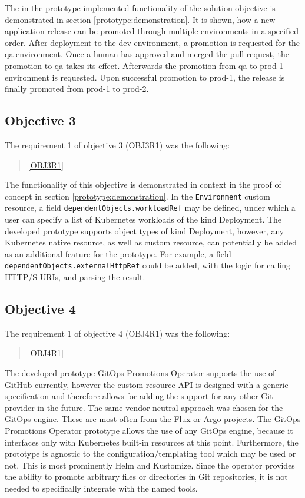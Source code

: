 The in the prototype implemented functionality of the solution objective is demonstrated in section
\ref{prototype:demonstration}.
It is shown, how a new application release can be promoted through multiple environments in a specified order.
After deployment to the dev environment, a promotion is requested for the qa environment.
Once a human has approved and merged the pull request, the promotion to qa takes its effect.
Afterwards the promotion from qa to prod-1 environment is requested. Upon successful promotion to prod-1,
the release is finally promoted from prod-1 to prod-2.

\subsection*{Objective 3}

The requirement 1 of objective 3 (OBJ3R1) was the following:

\begin{quotation}
	\noindent
	\ref{OBJ3R1}
\end{quotation}

The functionality of this objective is demonstrated in context in the proof of concept
in section \ref{prototype:demonstration}.
In the \lstinline|Environment| custom resource,
a field \lstinline|dependentObjects.workloadRef| may be defined, under which a user can specify
a list of Kubernetes workloads of the kind Deployment.
The developed prototype supports object types of kind Deployment,
however, any Kubernetes native resource, as well as custom resource, can potentially be added as an
additional feature for the prototype.
For example, a field \lstinline|dependentObjects.externalHttpRef| could be added,
with the logic for calling HTTP/S URIs, and parsing the result.

\subsection*{Objective 4}

The requirement 1 of objective 4 (OBJ4R1) was the following:

\begin{quotation}
	\noindent
	\ref{OBJ4R1}
\end{quotation}

The developed prototype GitOps Promotions Operator supports the use of GitHub currently,
however the custom resource API is designed with a generic specification and therefore allows
for adding the support for any other Git provider in the future.
The same vendor-neutral approach was chosen for the GitOps engine.
These are most often from the Flux or Argo projects.
The GitOps Promotions Operator prototype allows the use of any GitOps engine,
because it interfaces only with Kubernetes built-in resources at this point.
Furthermore, the prototype is agnostic to the configuration/templating tool which may be used or not.
This is most prominently Helm and Kustomize. Since the operator provides the ability
to promote arbitrary files or directories in Git repositories, it is not needed to specifically integrate
with the named tools.






